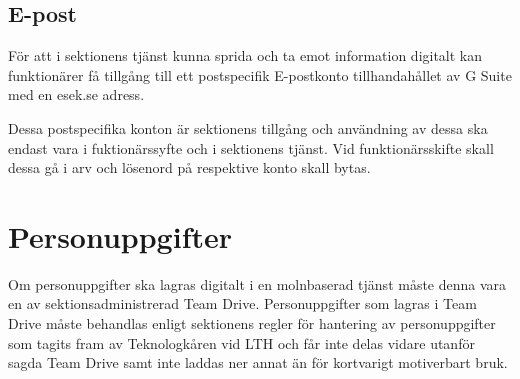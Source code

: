 \documentclass[../_main/handlingar.tex]{subfiles}
\begin{document}
    \vspace{10px}
    \subsection{E-post}
    \vspace{6px}

    För att i sektionens tjänst kunna sprida och ta emot information digitalt kan funktionärer få tillgång till ett postspecifik E-postkonto tillhandahållet av G Suite med en esek.se adress. 

    Dessa postspecifika konton är sektionens tillgång och användning av dessa ska endast vara i fuktionärssyfte och i sektionens tjänst. 
    Vid funktionärsskifte skall dessa gå i arv och lösenord på respektive konto skall bytas. 
    
    
    \vspace{6px}
    \section{Personuppgifter}
    \vspace{6px}
    Om personuppgifter ska lagras digitalt i en molnbaserad tjänst måste denna vara en av sektionsadministrerad Team Drive. 
    Personuppgifter som lagras i Team Drive måste behandlas enligt sektionens regler för hantering av personuppgifter som tagits fram av Teknologkåren vid LTH och får inte delas vidare utanför sagda Team Drive samt inte laddas ner annat än för kortvarigt motiverbart bruk.
\end{document}
